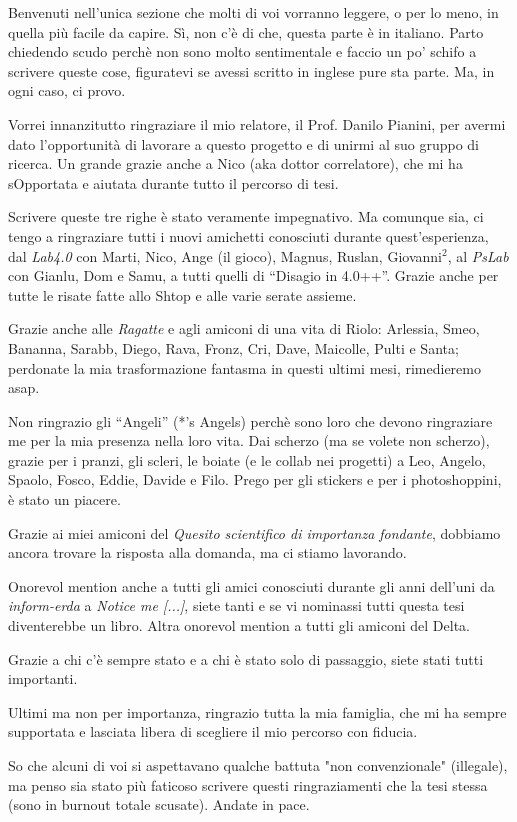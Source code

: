 \documentclass[12pt,a4paper,openright,twoside]{book}
\begin{document}
\begin{acknowledgements} %
    Benvenuti nell'unica sezione che molti di voi vorranno leggere, o per lo meno, in quella più facile da capire.
    Sì, non c'è di che, questa parte è in italiano.
    Parto chiedendo scudo perchè non sono molto sentimentale e faccio un po' schifo a scrivere queste cose, figuratevi
    se avessi scritto in inglese pure sta parte.
    Ma, in ogni caso, ci provo.

    Vorrei innanzitutto ringraziare il mio relatore, il Prof. Danilo Pianini, per avermi dato l'opportunità di lavorare
    a questo progetto e di unirmi al suo gruppo di ricerca.
    Un grande grazie anche a Nico (aka dottor correlatore), che mi ha sOpportata e aiutata durante tutto il percorso di tesi.

    Scrivere queste tre righe è stato veramente impegnativo.
    Ma comunque sia, ci tengo a ringraziare tutti i nuovi amichetti conosciuti durante quest'esperienza, dal \emph{Lab4.0} con
    Marti, Nico, Ange (il gioco), Magnus, Ruslan, Giovanni$^2$, al \emph{PsLab} con Gianlu, Dom e Samu, a tutti quelli
    di ``Disagio in 4.0++''.
    Grazie anche per tutte le risate fatte allo Shtop e alle varie serate assieme.

    Grazie anche alle \emph{Ragatte} e agli amiconi di una vita di Riolo: Arlessia, Smeo, Bananna, Sarabb, Diego, Rava, Fronz,
    Cri, Dave, Maicolle, Pulti e Santa; perdonate la mia trasformazione fantasma in questi ultimi mesi, rimedieremo asap.

    Non ringrazio gli ``Angeli'' (*'s Angels) perchè sono loro che devono ringraziare me per la mia presenza nella loro vita.
    Dai scherzo (ma se volete non scherzo), grazie per i pranzi, gli scleri, le boiate (e le collab nei progetti) a Leo,
    Angelo, Spaolo, Fosco, Eddie, Davide e Filo.
    Prego per gli stickers e per i photoshoppini, è stato un piacere.

    Grazie ai miei amiconi del \emph{Quesito scientifico di importanza fondante}, dobbiamo ancora trovare la risposta
    alla domanda, ma ci stiamo lavorando.

    Onorevol mention anche a tutti gli amici conosciuti durante gli anni dell'uni da \emph{inform-erda} a \emph{Notice me [...]},
    siete tanti e se vi nominassi tutti questa tesi diventerebbe un libro.
    Altra onorevol mention a tutti gli amiconi del Delta.

    Grazie a chi c'è sempre stato e a chi è stato solo di passaggio, siete stati tutti importanti.

    Ultimi ma non per importanza, ringrazio tutta la mia famiglia, che mi ha sempre supportata e lasciata libera di scegliere
    il mio percorso con fiducia.

    So che alcuni di voi si aspettavano qualche battuta "non convenzionale" (illegale), ma penso sia stato più faticoso
    scrivere questi ringraziamenti che la tesi stessa (sono in burnout totale scusate).
    Andate in pace.
\end{acknowledgements}
\end{document}
